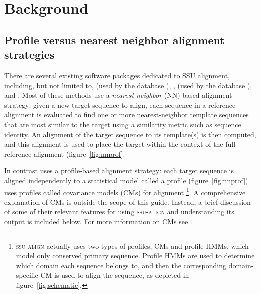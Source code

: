 \section{Background}


\subsection{Profile versus nearest neighbor alignment strategies}

There are several existing software packages dedicated to
SSU alignment, including, but not limited to, 
\cite{DeSantis06} (used by the  database
\cite{DeSantis06a}),  \cite{Caporaso10},
 (used by the  database
\cite{Pruesse07}), and  \cite{Schloss09}.
Most of these methods use a \emph{nearest-neighbor}
(NN) based alignment strategy: given a new target sequence to align,
each sequence in a reference alignment is evaluated to find one or
more nearest-neighbor template sequences that are most similar to the
target using a similarity metric such as sequence identity. An
alignment of the target sequence to its template(s) is then
computed, and this alignment is used to place the target within the
context of the full reference alignment (figure~\ref{fig:nnprof}.

In contrast  uses a profile-based alignment
strategy: each target sequence is aligned independently to a
statistical model called a profile
(figure~\ref{fig:nnprof}).  uses profiles called
covariance models (CMs) for alignment
\footnote{\textsc{ssu-align} actually uses two types of profiles,
  CMs and profile HMMs, which model only conserved primary
  sequence. Profile HMMs are used to determine which domain each
  sequence belongs to, and then the corresponding domain-specific CM
  is used to align the sequence, as depicted in
  figure~\ref{fig:schematic}.}.
A comprehensive explanation of CMs is outside the scope of this
guide. Instead, a brief discussion of some of their relevant features
for using \textsc{ssu-align} and understanding its output is included
below. For more information on CMs see
\cite{Eddy94,Durbin98,Eddy02b,NawrockiEddy07,Nawrocki09,Nawrocki09b,KolbeEddy09}.

